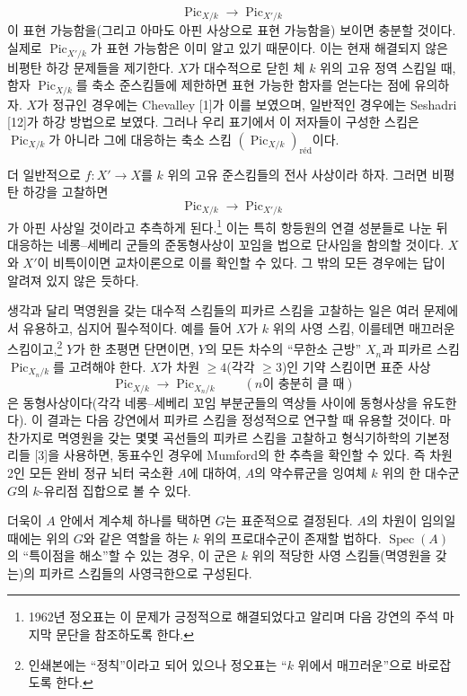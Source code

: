 \[
\operatorname{Pic}_{X/k}\longrightarrow\operatorname{Pic}_{X'/k}
\]
이 표현 가능함을(그리고 아마도 아핀 사상으로 표현 가능함을) 보이면 충분할
것이다. 실제로 $\operatorname{Pic}_{X'/k}$가 표현 가능함은 이미 알고 있기
때문이다. 이는 현재 해결되지 않은 비평탄 하강 문제들을 제기한다. $X$가
대수적으로 닫힌 체 $k$ 위의 고유 정역 스킴일 때, 함자
$\operatorname{Pic}_{X/k}$를 축소 준스킴들에 제한하면 표현 가능한 함자를
얻는다는 점에 유의하자. $X$가 정규인 경우에는 Chevalley [1]가 이를
보였으며, 일반적인 경우에는 Seshadri [12]가 하강 방법으로 보였다. 그러나
우리 표기에서 이 저자들이 구성한 스킴은 $\operatorname{Pic}_{X/k}$가 아니라
그에 대응하는 축소 스킴
$(\operatorname{Pic}_{X/k})_{\mathrm{réd}}$이다.

 더 일반적으로 $f:X'\longrightarrow X$를 $k$ 위의 고유
준스킴들의 전사 사상이라 하자. 그러면 비평탄 하강을 고찰하면
\[
\operatorname{Pic}_{X/k}\longrightarrow\operatorname{Pic}_{X'/k}
\]
가 아핀 사상일 것이라고 추측하게 된다.\footnote{1962년 정오표는 이 문제가
긍정적으로 해결되었다고 알리며 다음 강연의 주석 마지막 문단을 참조하도록
한다.} 이는 특히 항등원의 연결 성분들로 나눈 뒤 대응하는 네롱--세베리
군들의 준동형사상이 꼬임을 법으로 단사임을 함의할 것이다. $X$와 $X'$이
비특이이면 교차이론으로 이를 확인할 수 있다. 그 밖의 모든 경우에는 답이
알려져 있지 않은 듯하다.

 생각과 달리 멱영원을 갖는 대수적 스킴들의 피카르
스킴을 고찰하는 일은 여러 문제에서 유용하고, 심지어 필수적이다. 예를 들어
$X$가 $k$ 위의 사영 스킴, 이를테면 매끄러운 스킴이고,\footnote{인쇄본에는
``정칙''이라고 되어 있으나 정오표는 ``$k$ 위에서 매끄러운''으로 바로잡도록
한다.} $Y$가 한 초평면 단면이면, $Y$의 모든 차수의 ``무한소 근방'' $X_n$과
피카르 스킴 $\operatorname{Pic}_{X_n/k}$를 고려해야 한다. $X$가 차원
$\geq4$(각각 $\geq3$)인 기약 스킴이면 표준 사상
\[
\operatorname{Pic}_{X/k}\longrightarrow\operatorname{Pic}_{X_n/k}
\qquad(n\text{이 충분히 클 때})
\]
은 동형사상이다(각각 네롱--세베리 꼬임 부분군들의 역상들 사이에
동형사상을 유도한다). 이 결과는 다음 강연에서 피카르 스킴을 정성적으로
연구할 때 유용할 것이다. 마찬가지로 멱영원을 갖는 몇몇 곡선들의 피카르
스킴을 고찰하고 형식기하학의 기본정리들 [3]을 사용하면, 동표수인 경우에
Mumford의 한 추측을 확인할 수 있다. 즉 차원 2인 모든 완비 정규 뇌터 국소환
$A$에 대하여, $A$의 약수류군을 잉여체 $k$ 위의 한 대수군 $G$의 $k$-유리점
집합으로 볼 수 있다.

더욱이 $A$ 안에서 계수체 하나를 택하면 $G$는 표준적으로 결정된다. $A$의
차원이 임의일 때에는 위의 $G$와 같은 역할을 하는 $k$ 위의 프로대수군이
존재할 법하다. $\operatorname{Spec}(A)$의 ``특이점을 해소''할 수 있는
경우, 이 군은 $k$ 위의 적당한 사영 스킴들(멱영원을 갖는)의 피카르 스킴들의
사영극한으로 구성된다.

